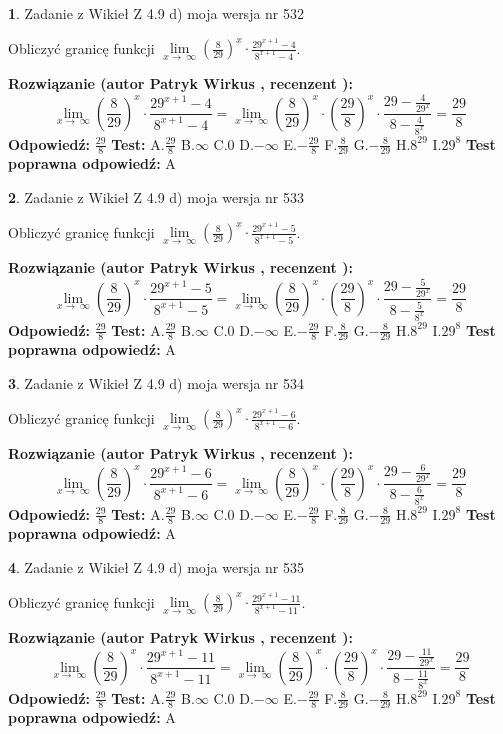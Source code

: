 \documentclass[12pt, a4paper]{article}
\theoremstyle{definition} %
\newtheorem{zad}{}
\newcommand{\zadStart}[1]{\begin{zad}#1\newline}
\newcommand{\zadStop}{\end{zad}}
\newcommand{\rozwStart}[2]{\noindent \textbf{Rozwiązanie (autor #1 , recenzent #2): }\newline}
\newcommand{\rozwStop}{\newline}
\newcommand{\odpStart}{\noindent \textbf{Odpowiedź:}\newline}
\newcommand{\odpStop}{\newline}
\newcommand{\testStart}{\noindent \textbf{Test:}\newline}
\newcommand{\testStop}{\newline}
\newcommand{\kluczStart}{\noindent \textbf{Test poprawna odpowiedź:}\newline}
\newcommand{\kluczStop}{\newline}
\begin{document}
\zadStart{Zadanie z Wikieł Z 4.9 d) moja wersja nr 532}


Obliczyć granicę funkcji  $\lim\limits_{x\to\ \infty}(\frac{8}{29})^{x}\cdot\frac{29^{x+1}-4}{8^{x+1}-4}$.
\zadStop
\rozwStart{Patryk Wirkus}{}
$$\lim\limits_{x\to\ \infty}(\frac{8}{29})^{x}\cdot\frac{29^{x+1}-4}{8^{x+1}-4}=\lim\limits_{x\to\ \infty}(\frac{8}{29})^{x}\cdot(\frac{29}{8})^{x} \cdot \frac{29-\frac{4}{29^{x}}}{8-\frac{4}{8^{x}}} = \frac{29}{8}$$
\rozwStop
\odpStart
$\frac{29}{8}$
\odpStop
\testStart
A.$\frac{29}{8}$ B.$\infty$ C.$0$ D.$-\infty$ E.$-\frac{29}{8}$
F.$\frac{8}{29}$ G.$-\frac{8}{29}$
H.$8^{29}$
I.$29^{8}$
\testStop
\kluczStart
A
\kluczStop



\zadStart{Zadanie z Wikieł Z 4.9 d) moja wersja nr 533}


Obliczyć granicę funkcji  $\lim\limits_{x\to\ \infty}(\frac{8}{29})^{x}\cdot\frac{29^{x+1}-5}{8^{x+1}-5}$.
\zadStop
\rozwStart{Patryk Wirkus}{}
$$\lim\limits_{x\to\ \infty}(\frac{8}{29})^{x}\cdot\frac{29^{x+1}-5}{8^{x+1}-5}=\lim\limits_{x\to\ \infty}(\frac{8}{29})^{x}\cdot(\frac{29}{8})^{x} \cdot \frac{29-\frac{5}{29^{x}}}{8-\frac{5}{8^{x}}} = \frac{29}{8}$$
\rozwStop
\odpStart
$\frac{29}{8}$
\odpStop
\testStart
A.$\frac{29}{8}$ B.$\infty$ C.$0$ D.$-\infty$ E.$-\frac{29}{8}$
F.$\frac{8}{29}$ G.$-\frac{8}{29}$
H.$8^{29}$
I.$29^{8}$
\testStop
\kluczStart
A
\kluczStop



\zadStart{Zadanie z Wikieł Z 4.9 d) moja wersja nr 534}


Obliczyć granicę funkcji  $\lim\limits_{x\to\ \infty}(\frac{8}{29})^{x}\cdot\frac{29^{x+1}-6}{8^{x+1}-6}$.
\zadStop
\rozwStart{Patryk Wirkus}{}
$$\lim\limits_{x\to\ \infty}(\frac{8}{29})^{x}\cdot\frac{29^{x+1}-6}{8^{x+1}-6}=\lim\limits_{x\to\ \infty}(\frac{8}{29})^{x}\cdot(\frac{29}{8})^{x} \cdot \frac{29-\frac{6}{29^{x}}}{8-\frac{6}{8^{x}}} = \frac{29}{8}$$
\rozwStop
\odpStart
$\frac{29}{8}$
\odpStop
\testStart
A.$\frac{29}{8}$ B.$\infty$ C.$0$ D.$-\infty$ E.$-\frac{29}{8}$
F.$\frac{8}{29}$ G.$-\frac{8}{29}$
H.$8^{29}$
I.$29^{8}$
\testStop
\kluczStart
A
\kluczStop



\zadStart{Zadanie z Wikieł Z 4.9 d) moja wersja nr 535}


Obliczyć granicę funkcji  $\lim\limits_{x\to\ \infty}(\frac{8}{29})^{x}\cdot\frac{29^{x+1}-11}{8^{x+1}-11}$.
\zadStop
\rozwStart{Patryk Wirkus}{}
$$\lim\limits_{x\to\ \infty}(\frac{8}{29})^{x}\cdot\frac{29^{x+1}-11}{8^{x+1}-11}=\lim\limits_{x\to\ \infty}(\frac{8}{29})^{x}\cdot(\frac{29}{8})^{x} \cdot \frac{29-\frac{11}{29^{x}}}{8-\frac{11}{8^{x}}} = \frac{29}{8}$$
\rozwStop
\odpStart
$\frac{29}{8}$
\odpStop
\testStart
A.$\frac{29}{8}$ B.$\infty$ C.$0$ D.$-\infty$ E.$-\frac{29}{8}$
F.$\frac{8}{29}$ G.$-\frac{8}{29}$
H.$8^{29}$
I.$29^{8}$
\testStop
\kluczStart
A
\kluczStop
\end{document}
